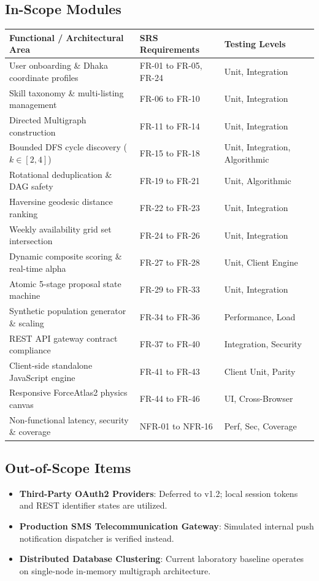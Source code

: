 \documentclass[12pt,a4paper]{report}
\begin{document}
\subsection{In-Scope Modules}
\begin{table}[ht]
\centering
\small
\begin{tabularx}{\textwidth}{X l l}
\toprule
\textbf{Functional / Architectural Area} & \textbf{SRS Requirements} & \textbf{Testing Levels} \\
\midrule
User onboarding \& Dhaka coordinate profiles & FR-01 to FR-05, FR-24 & Unit, Integration \\
Skill taxonomy \& multi-listing management & FR-06 to FR-10 & Unit, Integration \\
Directed Multigraph construction & FR-11 to FR-14 & Unit, Integration \\
Bounded DFS cycle discovery ($k \in [2, 4]$) & FR-15 to FR-18 & Unit, Integration, Algorithmic \\
Rotational deduplication \& DAG safety & FR-19 to FR-21 & Unit, Algorithmic \\
Haversine geodesic distance ranking & FR-22 to FR-23 & Unit, Integration \\
Weekly availability grid set intersection & FR-24 to FR-26 & Unit, Integration \\
Dynamic composite scoring \& real-time alpha & FR-27 to FR-28 & Unit, Client Engine \\
Atomic 5-stage proposal state machine & FR-29 to FR-33 & Unit, Integration \\
Synthetic population generator \& scaling & FR-34 to FR-36 & Performance, Load \\
REST API gateway contract compliance & FR-37 to FR-40 & Integration, Security \\
Client-side standalone JavaScript engine & FR-41 to FR-43 & Client Unit, Parity \\
Responsive ForceAtlas2 physics canvas & FR-44 to FR-46 & UI, Cross-Browser \\
Non-functional latency, security \& coverage & NFR-01 to NFR-16 & Perf, Sec, Coverage \\
\bottomrule
\end{tabularx}
\end{table}

\subsection{Out-of-Scope Items}
\begin{itemize}
    \item \textbf{Third-Party OAuth2 Providers}: Deferred to v1.2; local session tokens and REST identifier states are utilized.
    \item \textbf{Production SMS Telecommunication Gateway}: Simulated internal push notification dispatcher is verified instead.
    \item \textbf{Distributed Database Clustering}: Current laboratory baseline operates on single-node in-memory multigraph architecture.
\end{itemize}
\end{document}
